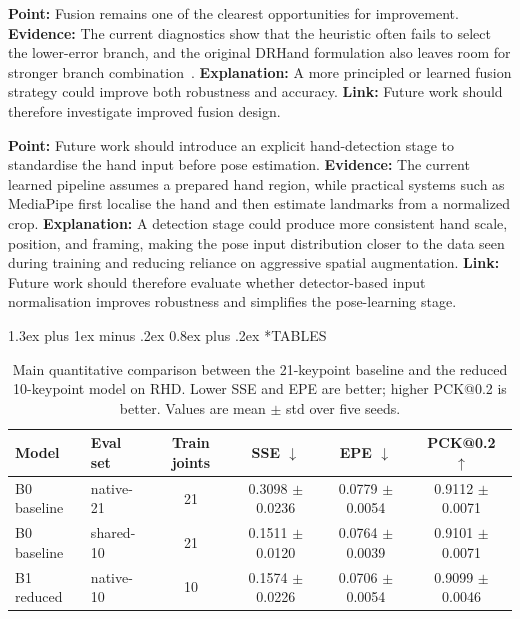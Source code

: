 \documentclass[10pt,letterpaper]{article}
\makeatletter
\renewcommand\section{\@startsection{section}{1}{\z@}%
  {1.3ex plus 1ex minus .2ex}%
  {0.8ex plus .2ex}%
  {\centering\normalfont\small\scshape}}
\makeatother
\begin{document}
\medskip
\noindent\textbf{Point:} Fusion remains one of the clearest opportunities for improvement.
\textbf{Evidence:} The current diagnostics show that the heuristic often fails to select the lower-error branch, and the original DRHand formulation also leaves room for stronger branch combination~\cite{dualreg}.
\textbf{Explanation:} A more principled or learned fusion strategy could improve both robustness and accuracy.
\textbf{Link:} Future work should therefore investigate improved fusion design.

\medskip
\noindent\textbf{Point:} Future work should introduce an explicit hand-detection stage to standardise the hand input before pose estimation.
\textbf{Evidence:} The current learned pipeline assumes a prepared hand region, while practical systems such as MediaPipe first localise the hand and then estimate landmarks from a normalized crop.
\textbf{Explanation:} A detection stage could produce more consistent hand scale, position, and framing, making the pose input distribution closer to the data seen during training and reducing reliance on aggressive spatial augmentation.
\textbf{Link:} Future work should therefore evaluate whether detector-based input normalisation improves robustness and simplifies the pose-learning stage.

\clearpage
\onecolumn
\section*{TABLES}

\begin{table}[H]
\centering
\footnotesize
\caption{Main quantitative comparison between the 21-keypoint baseline and the reduced 10-keypoint model on RHD. Lower SSE and EPE are better; higher PCK@0.2 is better. Values are mean $\pm$ std over five seeds.}
\label{tab:main_accuracy}
\begin{tabular}{llcccc}
\toprule
Model & Eval set & Train joints & SSE $\downarrow$ & EPE $\downarrow$ & PCK@0.2 $\uparrow$ \\
\midrule
B0 baseline & native-21 & 21 & 0.3098 $\pm$ 0.0236 & 0.0779 $\pm$ 0.0054 & 0.9112 $\pm$ 0.0071 \\
B0 baseline & shared-10 & 21 & 0.1511 $\pm$ 0.0120 & 0.0764 $\pm$ 0.0039 & 0.9101 $\pm$ 0.0071 \\
B1 reduced & native-10 & 10 & 0.1574 $\pm$ 0.0226 & 0.0706 $\pm$ 0.0054 & 0.9099 $\pm$ 0.0046 \\
\bottomrule
\end{tabular}
\end{table}
\end{document}
